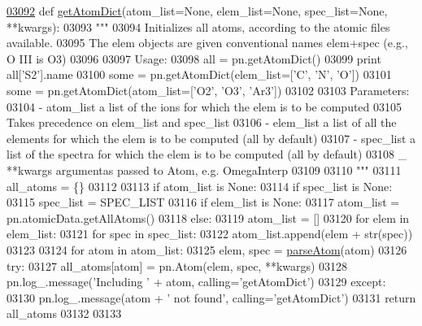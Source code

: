 \begin{DoxyCode}
\hypertarget{namespacepyneb_1_1core_1_1pynebcore_l03092}{}\hyperlink{namespacepyneb_1_1core_1_1pynebcore_a4e1b2e2f554c7c9c0b76419a45b2ee59}{03092} \textcolor{keyword}{def }\hyperlink{namespacepyneb_1_1core_1_1pynebcore_a4e1b2e2f554c7c9c0b76419a45b2ee59}{getAtomDict}(atom\_list=None, elem\_list=None, spec\_list=None, **kwargs):
03093     \textcolor{stringliteral}{""" }
03094 \textcolor{stringliteral}{    Initializes all atoms, according to the atomic files available.}
03095 \textcolor{stringliteral}{    The elem objects are given conventional names elem+spec (e.g., O III is O3)}
03096 \textcolor{stringliteral}{}
03097 \textcolor{stringliteral}{    Usage:}
03098 \textcolor{stringliteral}{        all = pn.getAtomDict()}
03099 \textcolor{stringliteral}{        print all['S2'].name}
03100 \textcolor{stringliteral}{        some = pn.getAtomDict(elem\_list=['C', 'N', 'O'])}
03101 \textcolor{stringliteral}{        some = pn.getAtomDict(atom\_list=['O2', 'O3', 'Ar3'])}
03102 \textcolor{stringliteral}{    }
03103 \textcolor{stringliteral}{    Parameters:}
03104 \textcolor{stringliteral}{        - atom\_list     a list of the ions for which the elem is to be computed }
03105 \textcolor{stringliteral}{                        Takes precedence on elem\_list and spec\_list}
03106 \textcolor{stringliteral}{        - elem\_list     a list of all the elements for which the elem is to be computed (all by default)}
03107 \textcolor{stringliteral}{        - spec\_list     a list of the spectra for which the elem is to be computed (all by default)}
03108 \textcolor{stringliteral}{        \_ **kwargs      argumentas passed to Atom, e.g. OmegaInterp}
03109 \textcolor{stringliteral}{}
03110 \textcolor{stringliteral}{    """} 
03111     all\_atoms = \{\}
03112 
03113     \textcolor{keywordflow}{if} atom\_list \textcolor{keywordflow}{is} \textcolor{keywordtype}{None}:       
03114         \textcolor{keywordflow}{if} spec\_list \textcolor{keywordflow}{is} \textcolor{keywordtype}{None}:
03115             spec\_list = SPEC\_LIST
03116         \textcolor{keywordflow}{if} elem\_list \textcolor{keywordflow}{is} \textcolor{keywordtype}{None}:
03117             atom\_list = pn.atomicData.getAllAtoms()
03118         \textcolor{keywordflow}{else}:
03119             atom\_list = []
03120             \textcolor{keywordflow}{for} elem \textcolor{keywordflow}{in} elem\_list:
03121                 \textcolor{keywordflow}{for} spec \textcolor{keywordflow}{in} spec\_list:
03122                     atom\_list.append(elem + str(spec)) 
03123 
03124     \textcolor{keywordflow}{for} atom \textcolor{keywordflow}{in} atom\_list:
03125         elem, spec = \hyperlink{namespacepyneb_1_1utils_1_1misc_a8c069186002a3e73dd474958e35034d5}{parseAtom}(atom)        
03126         \textcolor{keywordflow}{try}:
03127             all\_atoms[atom] = pn.Atom(elem, spec, **kwargs)
03128             pn.log\_.message(\textcolor{stringliteral}{'Including '} + atom, calling=\textcolor{stringliteral}{'getAtomDict'})
03129         \textcolor{keywordflow}{except}:
03130             pn.log\_.message(atom + \textcolor{stringliteral}{' not found'}, calling=\textcolor{stringliteral}{'getAtomDict'})
03131     \textcolor{keywordflow}{return} all\_atoms
03132 
03133 
\end{DoxyCode}
